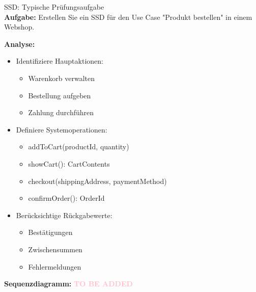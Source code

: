\begin{example2}{SSD: Typische Prüfungsaufgabe}\\
\textbf{Aufgabe:} Erstellen Sie ein SSD für den Use Case "Produkt bestellen" in einem Webshop.

\textbf{Analyse:}
\begin{itemize}
    \item Identifiziere Hauptaktionen:
    \begin{itemize}
        \item Warenkorb verwalten
        \item Bestellung aufgeben
        \item Zahlung durchführen
    \end{itemize}
    
    \item Definiere Systemoperationen:
    \begin{itemize}
        \item addToCart(productId, quantity)
        \item showCart(): CartContents
        \item checkout(shippingAddress, paymentMethod)
        \item confirmOrder(): OrderId
    \end{itemize}
    
    \item Berücksichtige Rückgabewerte:
    \begin{itemize}
        \item Bestätigungen
        \item Zwischensummen
        \item Fehlermeldungen
    \end{itemize}
\end{itemize}

\textbf{Sequenzdiagramm:} %
\textcolor{pink}{\textbf{TO BE ADDED}}
\end{example2}


